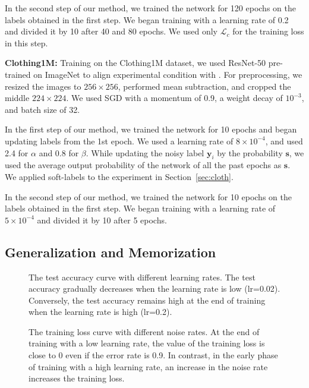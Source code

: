 \documentclass[10pt,twocolumn,letterpaper]{article}
\newcommand{\Sref}[1]{Section~\ref{#1}}
\begin{document}
In the second step of our method, we trained the network for 120 epochs on the labels obtained in the first step. We began training with a learning rate of 0.2 and divided it by 10 after 40 and 80 epochs. We used only $\mathcal{L}_c$ for the training loss in this step.

\vspace{2mm}\noindent\textbf{Clothing1M:}
Training on the Clothing1M dataset, we used ResNet-50 pre-trained on ImageNet to align experimental condition with \cite{patrini2016making}.
For preprocessing, we resized the images to $256\times256$, performed mean subtraction, and cropped the middle $224\times224$. We used SGD with a momentum of 0.9, a weight decay of $10^{-3}$, and batch size of 32.

In the first step of our method, we trained the network for 10 epochs and began updating labels from the 1st epoch. We used a learning rate of $8\times10^{-4}$, and used 2.4 for $\alpha$ and 0.8 for $\beta$. While updating the noisy label $\bm{y}_i$ by the probability $\bm{s}$, we used the average output probability of the network of all the past epochs as $\bm{s}$. We applied soft-labels to the experiment in \Sref{sec:cloth}.

In the second step of our method, we trained the network for 10 epochs on the labels obtained in the first step. We began training with a learning rate of $5\times10^{-4}$ and divided it by 10 after 5 epochs.

\subsection{Generalization and Memorization}\label{sec:prelim}
\begin{figure}[tb]
  \vspace{-6mm}
  \centering
  \caption{The test accuracy curve with different learning rates. The test accuracy gradually decreases when the learning rate is low (lr=0.02). Conversely, the test accuracy remains high at the end of training when the learning rate is high (lr=0.2).}
  \label{fig:acc}
  \vspace{-3mm}
\end{figure}
\begin{figure}[tb]
  \centering
  \caption{The training loss curve with different noise rates. At the end of training with a low learning rate, the value of the training loss is close to 0 even if the error rate is 0.9. In contrast, in the early phase of training with a high learning rate, an increase in the noise rate increases the training loss.}
  \label{fig:loss}
  \vspace{-3mm}
\end{figure}
\end{document}
